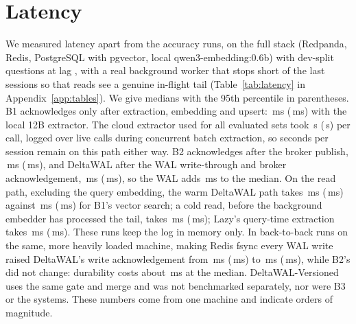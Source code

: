 \section{Latency}
\label{sec:latency}

We measured latency apart from the accuracy runs, on the full stack (Redpanda, Redis, PostgreSQL with pgvector, local qwen3-embedding:0.6b) with  dev-split questions at lag , with a real background worker that stops short of the last  sessions so that reads see a genuine in-flight tail (Table~\ref{tab:latency} in Appendix~\ref{app:tables}). We give medians with the 95th percentile in parentheses. B1 acknowledges only after extraction, embedding and upsert: \,ms (\,ms) with the local 12B extractor. The cloud extractor used for all evaluated sets took \,s (\,s) per call, logged over  live calls during concurrent batch extraction, so seconds per session remain on this path either way. B2 acknowledges after the broker publish, \,ms (\,ms), and DeltaWAL after the WAL write-through and broker acknowledgement, \,ms (\,ms), so the WAL adds \,ms to the median. On the read path, excluding the query embedding, the warm DeltaWAL path takes \,ms (\,ms) against \,ms (\,ms) for B1's vector search; a cold read, before the background embedder has processed the tail, takes \,ms (\,ms); Lazy's query-time extraction takes \,ms (\,ms). These runs keep the log in memory only. In back-to-back runs on the same, more heavily loaded machine, making Redis fsync every WAL write raised DeltaWAL's write acknowledgement from \,ms (\,ms) to \,ms (\,ms), while B2's did not change: durability costs about \,ms at the median. DeltaWAL-Versioned uses the same gate and merge and was not benchmarked separately, nor were B3 or the \memzero{} systems. These numbers come from one machine and indicate orders of magnitude.

